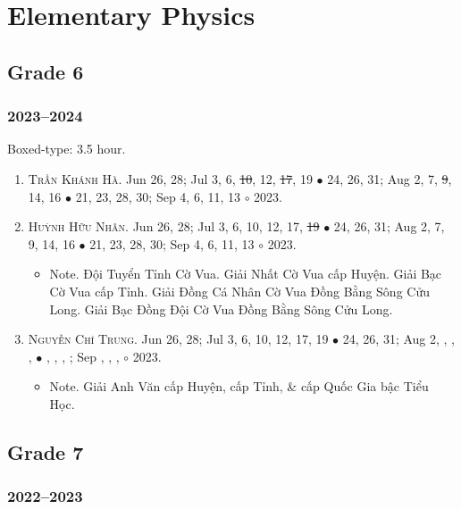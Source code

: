 \documentclass{article}
\begin{document}

\section{Elementary Physics}

\subsection{Grade 6}

\subsubsection{2023--2024}
Boxed-type: 3.5 hour.
\begin{enumerate}
	\item \textsc{Trần Khánh Hà.} {\sf[In]} Jun 26, 28; Jul 3, 6, \st{10}, 12, \st{17}, 19 $\bullet$ 24, 26, 31; Aug 2, 7, \st{9}, 14, 16 $\bullet$ 21, 23, 28, 30; Sep 4, 6, 11, 13 $\circ$ 2023. 
	\item \textsc{Huỳnh Hữu Nhân.} {\sf[In]} Jun 26, 28; Jul 3, 6, 10, 12, 17, \st{19} $\bullet$ 24, 26, 31; Aug 2, 7, 9, 14, 16 $\bullet$ 21, 23, 28, 30; Sep 4, 6, 11, 13 $\circ$ 2023.
	\begin{itemize}
		\item {\sf Note.} Đội Tuyển Tỉnh Cờ Vua. Giải Nhất Cờ Vua cấp Huyện. Giải Bạc Cờ Vua cấp Tỉnh. Giải Đồng Cá Nhân Cờ Vua Đồng Bằng Sông Cửu Long. Giải Bạc Đồng Đội Cờ Vua Đồng Bằng Sông Cửu Long.
	\end{itemize}
	\item \textsc{Nguyễn Chí Trung.} {\sf[In]} Jun 26, 28; Jul 3, 6, 10, 12, 17, 19 $\bullet$ 24, 26, 31; Aug 2, , , ,  $\bullet$ , , , ; Sep , , ,  $\circ$ 2023.
	\begin{itemize}
		\item {\sf Note.} Giải Anh Văn cấp Huyện, cấp Tỉnh, \& cấp Quốc Gia bậc Tiểu Học.
	\end{itemize}
\end{enumerate}

\subsection{Grade 7}

\subsubsection{2022--2023}
\end{document}
